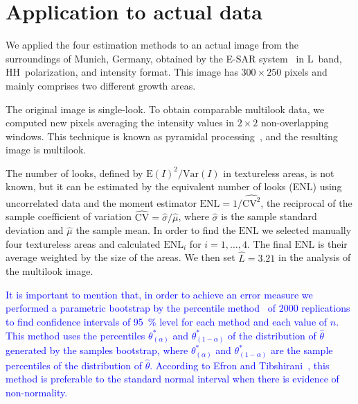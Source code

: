 \documentclass[twocolumn]{svjour3}
\begin{document}
	\section{Application to actual data}
	\label{application}
	
	We applied the four estimation methods to an actual image from the surroundings of Munich, Germany, obtained by the E-SAR system~\cite{Horn1996} in L~band, HH~polarization, and intensity format. 
	This image has $300\times250$ pixels and mainly comprises two different growth areas.
	
	The original image is single-look.
	To obtain comparable multilook data, we computed new pixels averaging the intensity values in $2\times2$ non-overlapping windows. This technique is known as pyramidal processing~\cite{Adelson1984}, and the resulting image is multilook.
	
	The number of looks, defined by ${\text{E}(I)^2}/{\text{Var}(I)}$ in textureless areas, is not known, but it can be estimated by the equivalent number of looks (ENL) using uncorrelated data and the moment estimator
	$\text{ENL}={1}/{\widehat{\text{CV}^2}}$, the reciprocal of the sample coefficient of variation $\widehat{\text{CV}}={\widehat{\sigma}}/{\widehat\mu}$, where $\widehat{\sigma}$ is the sample standard deviation and $\widehat\mu$ the sample mean.
	In order to find the $\text{ENL}$ we selected manually four textureless areas and calculated $\text{ENL}_i$ for $i=1, \ldots, 4$. 
	The final $\text{ENL}$ is their average weighted by the size of the areas. 
	We then set $\widehat L=3.21$ in the analysis of the multilook image.
	
	\textcolor{blue}{
	It is important to mention that, in order to achieve an error measure we performed a parametric bootstrap by the percentile method~\cite{Davison1997} of $2000$ replications to find confidence intervals of \SI{95}{\percent} level for each method and each value of $n$.     
	This method uses the percentiles $\theta^*_{(\alpha)}$ and $\theta^*_{(1-\alpha)}$ of the distribution of $\widehat{\theta} $ generated by the samples bootstrap, where $\theta^*_{(\alpha)}$ and $\theta^*_{(1-\alpha)}$ are the sample percentiles of the distribution of $\widehat{\theta} $. 
	According to Efron and Tibshirani~\cite{Efron93}, this method is preferable to the standard normal interval when there is evidence of non-normality.
}
	
\end{document}
